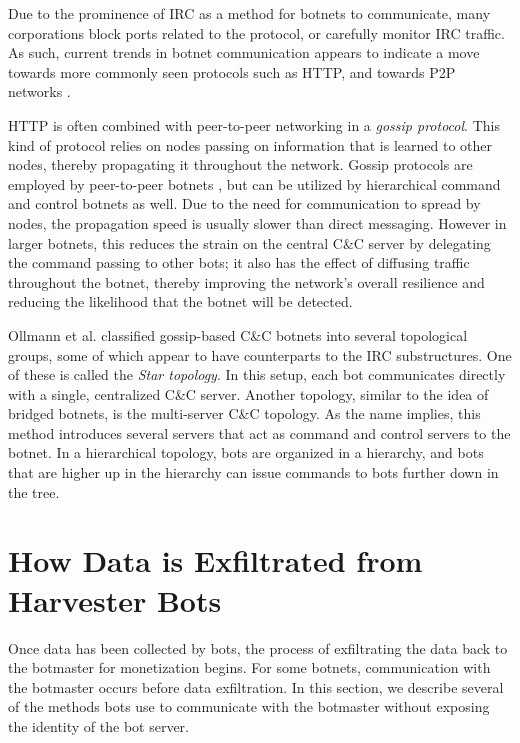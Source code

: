 \documentclass{acm_proc_article-sp}
\begin{document}
Due to the prominence of IRC as a method for botnets to communicate, many corporations block ports related to the protocol, or carefully monitor IRC traffic. As such, current trends in botnet communication appears to indicate a move towards more commonly seen protocols such as HTTP, and towards P2P networks \cite{cooke:survey}.


HTTP is often combined with peer-to-peer networking in a \emph{gossip protocol}. This kind of protocol relies on nodes passing on information that is learned to other nodes, thereby propagating it throughout the network. Gossip protocols are employed by peer-to-peer botnets \cite{defcon:prowling}, but can be utilized by hierarchical command and control botnets as well. Due to the need for communication to spread by nodes, the propagation speed is usually slower than direct messaging. However in larger botnets, this reduces the strain on the central C\&C server by delegating the command passing to other bots; it also has the effect of diffusing traffic throughout the botnet, thereby improving the network's overall resilience and reducing the likelihood that the botnet will be detected.

Ollmann et al. classified gossip-based C\&C botnets into several topological groups\cite{ollmann:topology}, some of which appear to have counterparts to the IRC substructures. One of these is called the \emph{Star topology}. In this setup, each bot communicates directly with a single, centralized C\&C server. Another topology, similar to the idea of bridged botnets, is the multi-server C\&C topology. As the name implies, this method introduces several servers that act as command and control servers to the botnet. In a hierarchical topology, bots are organized in a hierarchy, and bots that are higher up in the hierarchy can issue commands to bots further down in the tree.

\section{How Data is Exfiltrated from Harvester Bots}

Once data has been collected by bots, the process of exfiltrating the data back to the botmaster for monetization begins.  For some botnets, communication with the botmaster occurs before data exfiltration.  In this section, we describe several of the methods bots use to communicate with the botmaster without exposing the identity of the bot server.
\end{document}
